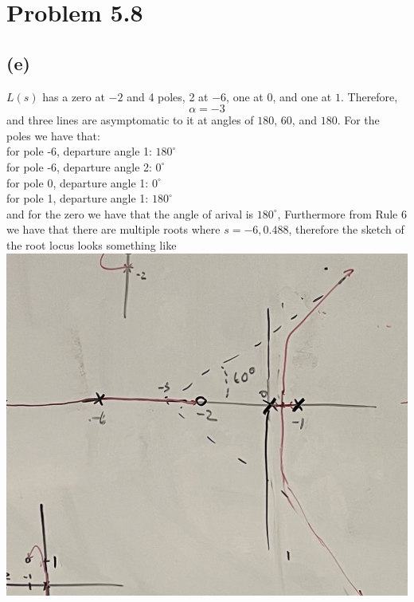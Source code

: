 \documentclass[12pt]{article}
\begin{document}
\section*{Problem 5.8}
\subsection*{(e)}
$L(s)$ has a zero at $-2$ and 4 poles, 2 at $-6$, one at $0$, and one at $1$. Therefore,
$$\alpha=-3$$
and three lines are asymptomatic to it at angles of $180$, $60$, and $180$.
For the poles we have that:\\
for pole -6, departure angle 1: $180^{\circ}$
\\for pole -6, departure angle 2: $0^{\circ}$
\\for pole 0, departure angle 1: $0^{\circ}$
\\for pole 1, departure angle 1: $180^{\circ}$
\\and for the zero we have that the angle of arival is $180^{\circ}$,
Furthermore from Rule 6 we have that there are multiple roots where $s=-6,0.488$, therefore the sketch of the root locus looks something like
\\\includegraphics[scale=.15]{Problem3Sketch1.jpg}
\end{document}
